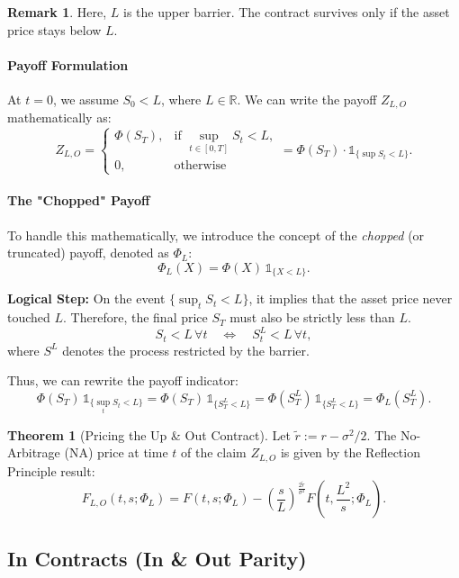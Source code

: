 \documentclass[12pt,a4paper]{article}
\theoremstyle{definition}
\newtheorem{theorem}{Theorem}[section]
\newtheorem{remark}{Remark}[section]
\begin{document}
\begin{remark}
Here, $L$ is the upper barrier. The contract survives only if the asset price stays below $L$.
\end{remark}

\paragraph{Payoff Formulation}

At $t=0$, we assume $S_0 < L$, where $L \in \mathbb{R}$. We can write the payoff $Z_{L,O}$ mathematically as:
\[
Z_{L,O} = 
\begin{cases}
\Phi(S_T), & \text{if } \sup_{t \in [0,T]} S_t < L, \\
0, & \text{otherwise}
\end{cases}
= \Phi(S_T) \cdot \mathds{1}_{\{\sup S_t < L\}}.
\]

\paragraph{The "Chopped" Payoff}

To handle this mathematically, we introduce the concept of the \emph{chopped} (or truncated) payoff, denoted as $\Phi_L$:
\[
\Phi_L(X) = \Phi(X)\, \mathds{1}_{\{X < L\}}.
\]

\textbf{Logical Step:} On the event $\{\sup_t S_t < L\}$, it implies that the asset price never touched $L$. Therefore, the final price $S_T$ must also be strictly less than $L$.
\[
S_t < L\, \forall t \quad \Longleftrightarrow \quad S_t^L < L\, \forall t,
\]
where $S^L$ denotes the process restricted by the barrier.

Thus, we can rewrite the payoff indicator:
\[
\Phi(S_T)\, \mathds{1}_{\{\sup_t S_t < L\}} = \Phi(S_T)\, \mathds{1}_{\{S_T^L < L\}} = \Phi(S_T^L)\, \mathds{1}_{\{S_T^L < L\}} = \Phi_L(S_T^L).
\]

\begin{theorem}[Pricing the Up \& Out Contract]
Let $\widetilde{r} := r - \sigma^2/2$. The No-Arbitrage (NA) price at time $t$ of the claim $Z_{L,O}$ is given by the Reflection Principle result:
\[
F_{L,O}(t, s; \Phi_L) = F(t, s; \Phi_L) - \left(\frac{s}{L}\right)^{\frac{2\widetilde{r}}{\sigma^2}} F\!\left(t, \frac{L^2}{s}; \Phi_L\right).
\]
\end{theorem}

\subsection{In Contracts (In \& Out Parity)}
\end{document}
